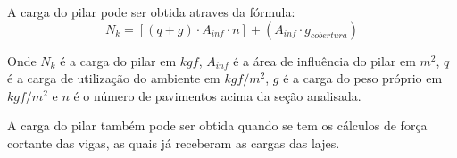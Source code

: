 A carga do pilar pode ser obtida atraves da fórmula:
\begin{equation}N_k=[(q+g)\cdot A_{inf}\cdot n]+(A_{inf}\cdot g_{cobertura})\end{equation}

Onde $N_k$ é a carga do pilar em $kgf$, $A_{inf}$ é a área de influência do pilar em $m^2$, $q$ é a carga de utilização do ambiente em $kgf/m^2$, $g$ é a carga do peso próprio em $kgf/m^2$ e $n$ é o número de pavimentos acima da seção analisada.

A carga do pilar também pode ser obtida quando se tem os cálculos de força cortante das vigas, as quais já receberam as cargas das lajes.